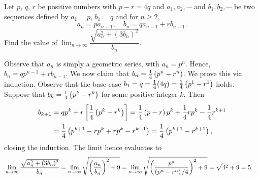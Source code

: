 \begin{question}[5]\label{A::2021-O-1-25}
    Let $p$, $q$, $r$ be positive numbers with $p-r= 4q$ and $a_1, a_2, \cdots$ and $b_1, b_2, \cdots$ be two sequences defined by $a_1 = p$, $b_1 = q$ and for $n \geq 2$, \[a_n = pa_{n-1}, \quad b_n = qa_{n-1} + rb_{n-1}.\] Find the value of $\displaystyle\lim_{n \to \infty} \dfrac{\sqrt{a_n^2 + (3b_n)^2}}{b_n}$.
\end{question}

Observe that $a_n$ is simply a geometric series, with $a_n = p^n$. Hence, $b_n = qp^{n-1} + rb_{n-1}$. We now claim that $b_n = \frac14 \left( p^n - r^n \right)$. We prove this via induction. Observe that the base case $b_1 = q = \frac14 (4q) = \frac14 \left( p^1 - r^1 \right)$ holds. Suppose that $b_k = \frac14 \left( p^k - r^k \right)$ for some positive integer $k$. Then
\begin{align*}
    b_{k+1} &= qp^{k} + r\left[ \frac14 \left( p^k - r^k \right) \right] = \frac14 \left( p-r \right) p^{k} + \frac14 r p^k - \frac14 r^{k+1}\\&= \frac14 \left( p^{k+1} - rp^{k} + rp^k - r^{k+1} \right) = \frac14 \left( p^{k+1} - r^{k+1} \right),
\end{align*}
closing the induction. The limit hence evaluates to
\begin{align*}
    &\lim_{n \to \infty} \dfrac{\sqrt{a_n^2 + (3b_n)^2}}{b_n} = \lim_{n \to \infty} \sqrt{\left( \frac{a_n}{b_n} \right)^2 + 9} = \lim_{n \to \infty} \sqrt{\left( \frac{p^n}{\left( p^n - r^n \right)/4} \right)^2 + 9} = \sqrt{4^2 + 9} = 5.
\end{align*}
